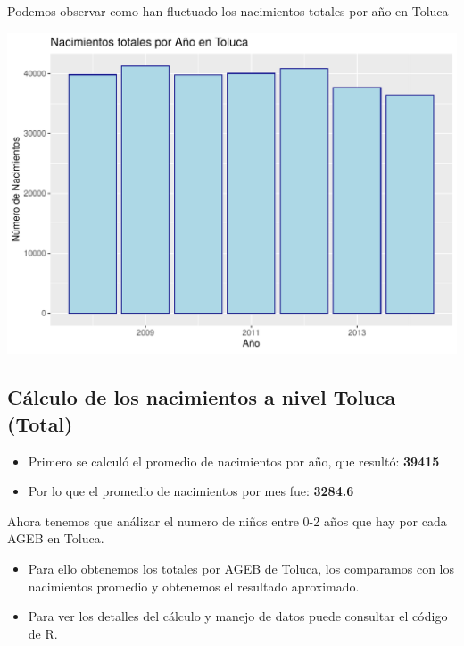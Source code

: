 \documentclass[
  landscape]{article}
\providecommand{\tightlist}{%
  \setlength{\itemsep}{0pt}\setlength{\parskip}{0pt}}
\begin{document}
Podemos observar como han fluctuado los nacimientos totales por año en
Toluca

\begin{center}\includegraphics{bebes_toluca_files/figure-latex/Grafica_superficie -1} \end{center}

\hypertarget{cuxe1lculo-de-los-nacimientos-a-nivel-toluca-total}{%
\subsection{Cálculo de los nacimientos a nivel Toluca
(Total)}\label{cuxe1lculo-de-los-nacimientos-a-nivel-toluca-total}}

\begin{itemize}
\tightlist
\item
  Primero se calculó el promedio de nacimientos por año, que resultó:
  \textbf{39415}
\item
  Por lo que el promedio de nacimientos por mes fue: \textbf{3284.6}
\end{itemize}

\newpage

Ahora tenemos que análizar el numero de niños entre 0-2 años que hay por
cada AGEB en Toluca.

\begin{itemize}
\item
  Para ello obtenemos los totales por AGEB de Toluca, los comparamos con
  los nacimientos promedio y obtenemos el resultado aproximado.
\item
  Para ver los detalles del cálculo y manejo de datos puede consultar el
  código de R.
\end{itemize}
\end{document}
